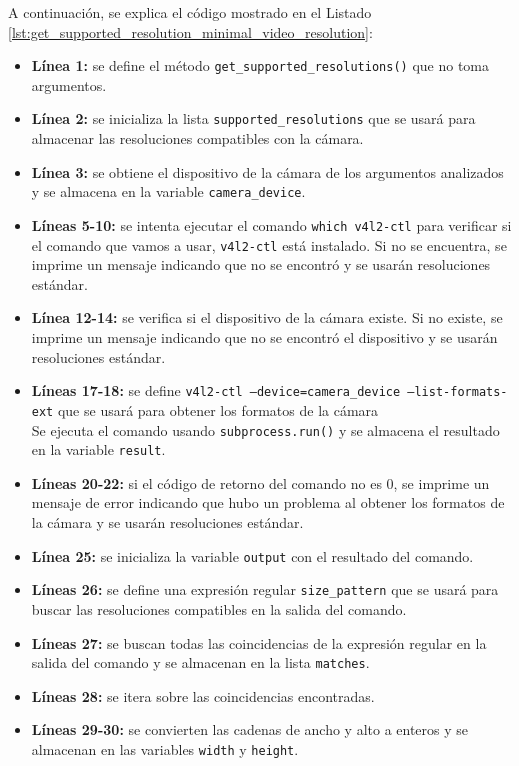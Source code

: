 A continuación, se explica el código mostrado en el Listado \ref{lst:get_supported_resolution_minimal_video_resolution}:
\begin{itemize}
    \item \textbf{Línea 1:} se define el método \texttt{get\_supported\_resolutions()} que no toma argumentos.
    \item \textbf{Línea 2:} se inicializa la lista \texttt{supported\_resolutions} que se usará para almacenar las resoluciones compatibles con la cámara.
    \item \textbf{Línea 3:} se obtiene el dispositivo de la cámara de los argumentos analizados y se almacena en la variable \texttt{camera\_device}.
    \item \textbf{Líneas 5-10:} se intenta ejecutar el comando \texttt{which v4l2-ctl} para verificar si el comando que vamos a usar, \texttt{v4l2-ctl} está instalado. Si no se encuentra, se imprime un mensaje indicando que no se encontró y se usarán resoluciones estándar.
    \item \textbf{Línea 12-14:} se verifica si el dispositivo de la cámara existe. Si no existe, se imprime un mensaje indicando que no se encontró el dispositivo y se usarán resoluciones estándar.
    \item \textbf{Líneas 17-18:} se define \texttt{v4l2-ctl --device=camera\_device --list-formats-ext} que se usará para obtener los formatos de la cámara \\
    Se ejecuta el comando usando \texttt{subprocess.run()} y se almacena el resultado en la variable \texttt{result}.
    \item \textbf{Líneas 20-22:} si el código de retorno del comando no es 0, se imprime un mensaje de error indicando que hubo un problema al obtener los formatos de la cámara y se usarán resoluciones estándar.
    \item \textbf{Línea 25:} se inicializa la variable \texttt{output} con el resultado del comando.
    \item \textbf{Líneas 26:} se define una expresión regular \texttt{size\_pattern} que se usará para buscar las resoluciones compatibles en la salida del comando.
    \item \textbf{Líneas 27:} se buscan todas las coincidencias de la expresión regular en la salida del comando y se almacenan en la lista \texttt{matches}.
    \item \textbf{Líneas 28:} se itera sobre las coincidencias encontradas.
    \item \textbf{Líneas 29-30:} se convierten las cadenas de ancho y alto a enteros y se almacenan en las variables \texttt{width} y \texttt{height}.

\end{itemize}
